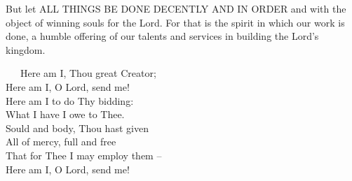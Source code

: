 \documentclass[
]{book}
\begin{document}
But let ALL THINGS BE DONE DECENTLY AND IN ORDER and with the object of winning souls for the Lord. For that is the spirit in which our work is done, a humble offering of our talents and services in building the Lord's kingdom.

~~~Here am I, Thou great Creator;\\
\hspace*{0.333em}\hspace*{0.333em}\hspace*{0.333em}Here am I, O Lord, send me!\\
\hspace*{0.333em}\hspace*{0.333em}\hspace*{0.333em}Here am I to do Thy bidding:\\
\hspace*{0.333em}\hspace*{0.333em}\hspace*{0.333em}What I have I owe to Thee.\\
\hspace*{0.333em}\hspace*{0.333em}\hspace*{0.333em}Sould and body, Thou hast given\\
\hspace*{0.333em}\hspace*{0.333em}\hspace*{0.333em}All of mercy, full and free\\
\hspace*{0.333em}\hspace*{0.333em}\hspace*{0.333em}That for Thee I may employ them --\\
\hspace*{0.333em}\hspace*{0.333em}\hspace*{0.333em}Here am I, O Lord, send me!
\end{document}
